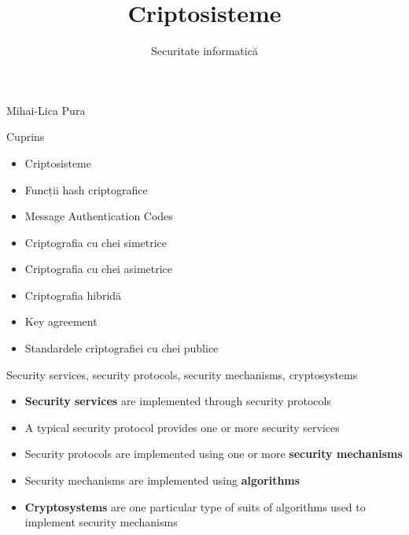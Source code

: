 \documentclass[pdf]{beamer}
\title{Criptosisteme}
\subtitle{Securitate informatică}
\begin{document}
\begin{frame}
	\titlepage
	
\begin{flushright}
Mihai-Lica Pura\\
\end{flushright}

\end{frame}



\begin{frame}{Cuprins}
\begin{itemize}
\item
Criptosisteme
\item
Funcții hash criptografice
\item
Message Authentication Codes
\item
Criptografia cu chei simetrice
\item
Criptografia cu chei asimetrice
\item
Criptografia hibridă
\item
Key agreement
\item
Standardele criptografiei cu chei publice
\end{itemize}
\end{frame}



\begin{frame}{Security services, security protocols, security mechanisms, cryptosystems}
\begin{itemize}
\item
\textbf{Security services} are implemented through security protocols

\item
A typical security protocol provides one or more security services

\item
Security protocols are implemented using one or more \textbf{security mechanisms}

\item
Security mechanisms are implemented using \textbf{algorithms}

\item
\textbf{Cryptosystems} are one particular type of suits of algorithms used to implement security mechanisms

\end{itemize}
\end{frame}
\end{document}
